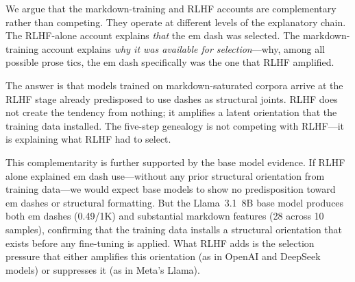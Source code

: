 We argue that the markdown-training and RLHF accounts are complementary rather than competing. They operate at different levels of the explanatory chain. The RLHF-alone account explains \textit{that} the em dash was selected. The markdown-training account explains \textit{why it was available for selection}---why, among all possible prose tics, the em dash specifically was the one that RLHF amplified.

The answer is that models trained on markdown-saturated corpora arrive at the RLHF stage already predisposed to use dashes as structural joints. RLHF does not create the tendency from nothing; it amplifies a latent orientation that the training data installed. The five-step genealogy is not competing with RLHF---it is explaining what RLHF had to select.

This complementarity is further supported by the base model evidence. If RLHF alone explained em dash use---without any prior structural orientation from training data---we would expect base models to show no predisposition toward em dashes or structural formatting. But the Llama~3.1~8B base model produces both em dashes (0.49/1K) and substantial markdown features (28 across 10 samples), confirming that the training data installs a structural orientation that exists before any fine-tuning is applied. What RLHF adds is the selection pressure that either amplifies this orientation (as in OpenAI and DeepSeek models) or suppresses it (as in Meta's Llama).
